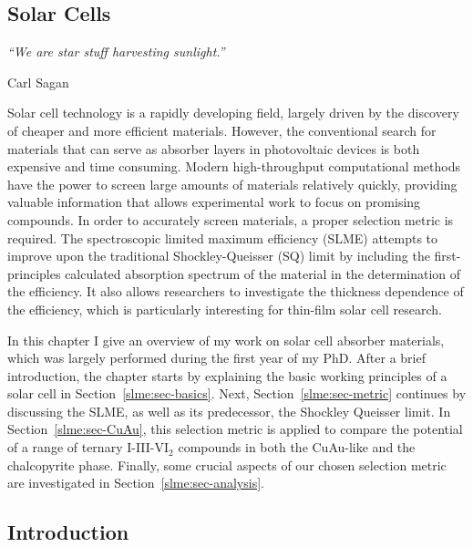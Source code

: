\begin{refsection} 
 
\chapter{Solar Cells} \label{chapter:slme} 
 
\setlength{\epigraphwidth}{3in} 
\epigraph{\textit{``We are star stuff harvesting sunlight.”}}{Carl Sagan} 
\vspace{3em} 
 
Solar cell technology is a rapidly developing field, largely driven by the 
discovery of cheaper and more efficient materials. However, the conventional 
search for materials that can serve as absorber layers in photovoltaic devices is both expensive and 
time consuming. Modern high-throughput computational methods have the power to 
screen large amounts of materials relatively quickly, providing valuable 
information that allows experimental work to focus on promising compounds. In 
order to accurately screen materials, a proper selection metric is required. 
The spectroscopic limited maximum efficiency (SLME) attempts to improve upon 
the traditional Shockley-Queisser (SQ) limit by including the first-principles 
calculated absorption spectrum of the material in the determination of the 
efficiency. It also allows researchers to investigate the thickness dependence 
of the efficiency, which is particularly interesting for thin-film solar cell 
research.
 
In this chapter I give an overview of my work on solar cell absorber materials, 
which was largely performed during the first year of my PhD. After a brief 
introduction, the chapter
starts by explaining the basic working principles of a solar cell 
in Section~\ref{slme:sec-basics}. Next, Section~\ref{slme:sec-metric} 
continues by discussing the SLME, as well as its predecessor, the Shockley 
Queisser limit. In Section~\ref{slme:sec-CuAu}, this selection metric is 
applied to compare the potential of a range of ternary I-III-VI$_2$ compounds 
in both the CuAu-like and the chalcopyrite phase. Finally, some crucial 
aspects of our chosen selection metric are investigated in 
Section~\ref{slme:sec-analysis}. 
 
\pagebreak 

\section{Introduction} 
 

\end{refsection}
